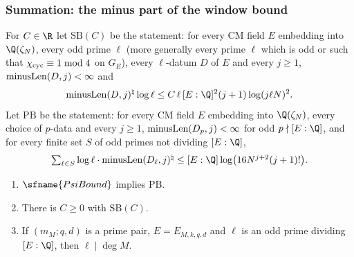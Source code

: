 \subsubsection{Summation: the minus part of the window bound}

\begin{definition}\label{pf:vwin:pbsb}
For $C\in\R$ let $\mathrm{SB}(C)$ be the statement: for every CM field $E$ embedding into $\Q(\zeta_N)$, every odd prime $\ell$ (more generally every
prime $\ell$ which is odd or such that $\chi_{\mathrm{cyc}}\equiv1\bmod4$ on $G_E$), every $\ell$-datum $D$ of $E$ and every $j\ge1$, $\mathrm{minusLen}(D,j)<\infty$ and
\[
 \vwinmin(D,j)^\natural\log\ell\le C\,\ell\,[E:\Q]^2(j+1)\log(j\ell N)^2 .
\]
Let $\mathrm{PB}$ be the statement: for every CM field $E$ embedding into $\Q(\zeta_N)$, every choice of $p$-data and every $j\ge1$,
$\mathrm{minusLen}(D_p,j)<\infty$ for odd $p\nmid[E:\Q]$, and for every finite set $S$ of odd primes not dividing $[E:\Q]$,
\[
\textstyle\sum_{\ell\in S}\log\ell\cdot\vwinmin(D_\ell,j)^\natural\le[E:\Q]\log\bigl(16N^{j+2}(j+1)!\bigr).
\]
\end{definition}

\begin{lemma}\label{pf:vwin:pb}
\begin{enumerate}[label=(\alph*)]
\item $\sfname{PsiBound}$ implies $\mathrm{PB}$.
\item There is $C\ge0$ with $\mathrm{SB}(C)$.
\item If $(m_M;q,d)$ is a prime pair, $E=E_{M,k,q,d}$ and $\ell$ is an odd prime dividing $[E:\Q]$, then $\ell\mid\deg M$.
\end{enumerate}
\end{lemma}

